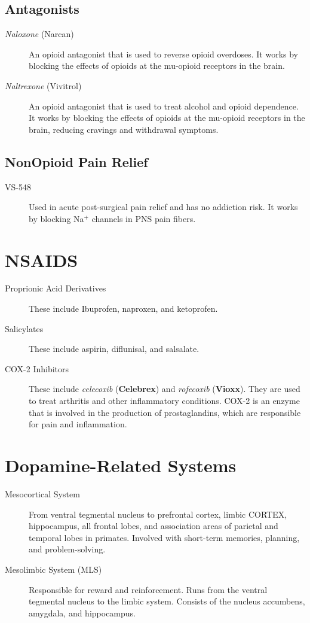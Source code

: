 \subsection*{Antagonists}
\begin{description}
    \item[\textit{Naloxone} (Narcan)] An opioid antagonist that is used to reverse opioid overdoses. It works by blocking the effects of opioids at the mu-opioid receptors in the brain.
    \item[\textit{Naltrexone} (Vivitrol)] An opioid antagonist that is used to treat alcohol and opioid dependence. It works by blocking the effects of opioids at the mu-opioid receptors in the brain, reducing cravings and withdrawal symptoms.
\end{description}

\subsection*{NonOpioid Pain Relief}
\begin{description}
    \item[VS-548] Used in acute post-surgical pain relief and has no addiction risk. It works by blocking Na\(^+\) channels in PNS pain fibers.
\end{description}

\section*{NSAIDS}
\begin{description}
    \item[Proprionic Acid Derivatives] These include Ibuprofen, naproxen, and ketoprofen.
    \item[Salicylates] These include aspirin, diflunisal, and salsalate.
    \item[COX-2 Inhibitors] These include \textit{celecoxib} (\textbf{Celebrex}) and \textit{rofecoxib} (\textbf{Vioxx}). They are used to treat arthritis and other inflammatory conditions. COX-2 is an enzyme that is involved in the production of prostaglandins, which are responsible for pain and inflammation.  
\end{description}

\section*{Dopamine-Related Systems}
\begin{description}
    \item[Mesocortical System] From ventral tegmental nucleus to prefrontal cortex, limbic CORTEX, hippocampus, all frontal lobes, and association areas of parietal and temporal lobes in primates. Involved with short-term memories, planning, and problem-solving.
    \item[Mesolimbic System (MLS)] Responsible for reward and reinforcement. Runs from the ventral tegmental nucleus to the limbic system. Consists of the nucleus accumbens, amygdala, and hippocampus.
\end{description}